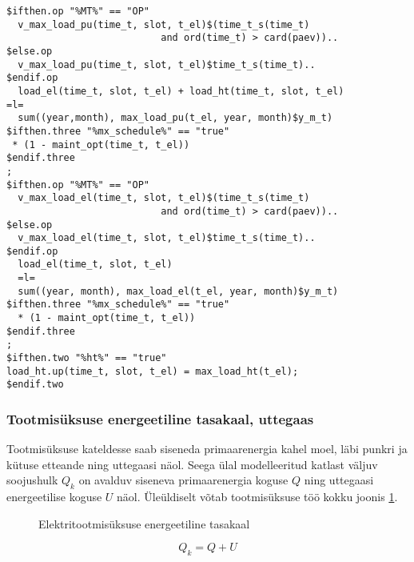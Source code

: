 \documentclass[10pt,a4paper]{article}
\begin{document}
\begin{verbatim}
$ifthen.op "%MT%" == "OP"
  v_max_load_pu(time_t, slot, t_el)$(time_t_s(time_t)
                           and ord(time_t) > card(paev))..
$else.op
  v_max_load_pu(time_t, slot, t_el)$time_t_s(time_t)..
$endif.op
  load_el(time_t, slot, t_el) + load_ht(time_t, slot, t_el)
=l=
  sum((year,month), max_load_pu(t_el, year, month)$y_m_t)
$ifthen.three "%mx_schedule%" == "true"
 * (1 - maint_opt(time_t, t_el))
$endif.three
;
$ifthen.op "%MT%" == "OP"
  v_max_load_el(time_t, slot, t_el)$(time_t_s(time_t)
                           and ord(time_t) > card(paev))..
$else.op
  v_max_load_el(time_t, slot, t_el)$time_t_s(time_t)..
$endif.op
  load_el(time_t, slot, t_el)
  =l=
  sum((year, month), max_load_el(t_el, year, month)$y_m_t)
$ifthen.three "%mx_schedule%" == "true"
  * (1 - maint_opt(time_t, t_el))
$endif.three
;
$ifthen.two "%ht%" == "true"
load_ht.up(time_t, slot, t_el) = max_load_ht(t_el);
$endif.two
\end{verbatim}

\subsubsection{Tootmisüksuse energeetiline tasakaal, uttegaas}
Tootmisüksuse kateldesse saab siseneda primaarenergia kahel moel, läbi punkri ja kütuse etteande ning uttegaasi näol. Seega ülal modelleeritud katlast väljuv soojushulk $Q_k$ on avalduv siseneva primaarenergia koguse $Q$ ning uttegaasi energeetilise koguse $U$ näol.
Üleüldiselt võtab tootmisüksuse töö kokku joonis \ref{joon3}.

\begin{figure}

\caption{Elektritootmisüksuse energeetiline tasakaal
\label{joon3}}
\end{figure}

\begin{equation}
Q_k = Q + U
\end{equation}
\end{document}
